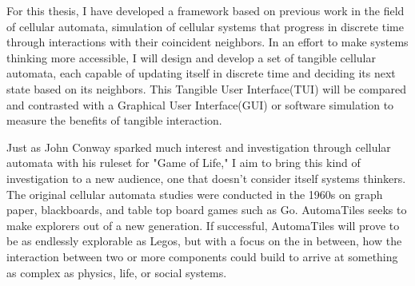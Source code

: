% 
% 
%
For this thesis, I have developed a framework based on previous work in the field of cellular automata, simulation of cellular systems that progress in discrete time through interactions with their coincident neighbors. In an effort to make systems thinking more accessible, I will design and develop a set of tangible cellular automata, each capable of updating itself in discrete time and deciding its next state based on its neighbors. This Tangible User Interface(TUI) will be compared and contrasted with a Graphical User Interface(GUI) or software simulation to measure the benefits of tangible interaction.

Just as John Conway sparked much interest and investigation through cellular automata with his ruleset for "Game of Life," I aim to bring this kind of investigation to a new audience, one that doesn't consider itself systems thinkers. The original cellular automata studies were conducted in the 1960s on graph paper, blackboards, and table top board games such as Go. AutomaTiles seeks to make explorers out of a new generation. If successful, AutomaTiles will prove to be as endlessly explorable as Legos, but with a focus on the in between, how the interaction between two or more components could build to arrive at something as complex as physics, life, or social systems.
